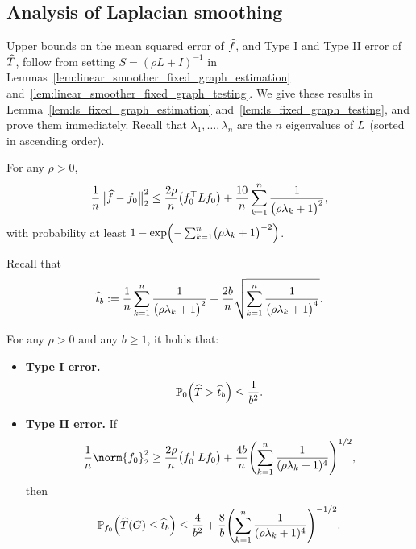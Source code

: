 \subsection{Analysis of Laplacian smoothing}

Upper bounds on the mean squared error of $\widehat{f}$, and Type I and Type II error of $\widehat{T}$, follow from setting $S = (\rho L + I)^{-1}$ in Lemmas~\ref{lem:linear_smoother_fixed_graph_estimation} and~\ref{lem:linear_smoother_fixed_graph_testing}. We give these results in Lemma~\ref{lem:ls_fixed_graph_estimation} and~\ref{lem:ls_fixed_graph_testing}, and prove them immediately. Recall that $\lambda_1,\ldots,\lambda_n$ are the $n$ eigenvalues of $L$ (sorted in ascending order).
\begin{lemma}
	\label{lem:ls_fixed_graph_estimation}
	For any $\rho > 0$,
	\begin{equation}
	\label{eqn:ls_fixed_graph_estimation_prob}
	\frac{1}{n}\bigl\|\widehat{f} - f_0\bigr\|_2^2 \leq \frac{2\rho}{n} \bigl(f_0^{\top} L f_0\bigr) + \frac{10}{n}\sum_{k = 1}^{n} \frac{1}{\bigl(\rho \lambda_{k} + 1\bigr)^2},
	\end{equation}
	with probability at least $1 - \exp\Bigl(-\sum_{k = 1}^{n}\bigl(\rho \lambda_k + 1\bigr)^{-2}\Bigr)$.
\end{lemma}
Recall that 
\begin{equation*}
\widehat{t}_b := \frac{1}{n}\sum_{k = 1}^{n} \frac{1}{\bigl(\rho \lambda_k + 1\bigr)^2} + \frac{2b}{n}\sqrt{\sum_{k = 1}^{n} \frac{1}{\bigl(\rho \lambda_k + 1\bigr)^4}}.
\end{equation*}
\begin{lemma}
	\label{lem:ls_fixed_graph_testing}
	For any $\rho > 0$ and any $b \geq 1$, it holds that:
	\begin{itemize}
		\item \textbf{Type I error.}
		\begin{equation}
		\label{eqn:ls_fixed_graph_testing_typeI}
		\mathbb{P}_0\Bigl(\widehat{T} > \widehat{t}_b\Bigr) \leq \frac{1}{b^2}.
		\end{equation}
		\item \textbf{Type II error.} If
		\begin{equation}
		\label{eqn:ls_fixed_graph_testing_critical_radius}
		\frac{1}{n}\norm{f_0}_2^2 \geq \frac{2 \rho}{n} \bigl(f_0^{\top} \Lap f_0\bigr) + \frac{4b}{n} \Biggl(\sum_{k = 1}^{n} \frac{1}{(\rho\lambda_k + 1)^4} \Biggr)^{1/2},
		\end{equation}
		then
		\begin{equation}
		\label{eqn:ls_fixed_graph_testing_typeII}
		\mathbb{P}_{f_0}\Bigl(\widehat{T}(G) \leq \widehat{t}_b\Bigr) \leq \frac{4}{b^2} + \frac{8}{b} \Biggl(\sum_{k = 1}^{n} \frac{1}{(\rho\lambda_k + 1)^4} \Biggr)^{-1/2}.
		\end{equation}
	\end{itemize}
\end{lemma}

